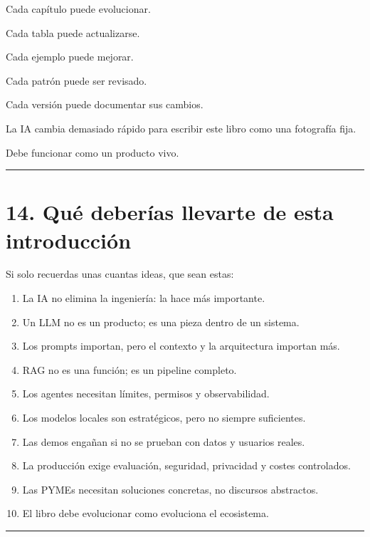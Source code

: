 Cada capítulo puede evolucionar.

Cada tabla puede actualizarse.

Cada ejemplo puede mejorar.

Cada patrón puede ser revisado.

Cada versión puede documentar sus cambios.

La IA cambia demasiado rápido para escribir este libro como una
fotografía fija.

Debe funcionar como un producto vivo.

\begin{center}\rule{0.5\linewidth}{0.5pt}\end{center}

\section{14. Qué deberías llevarte de esta
introducción}\label{quuxe9-deberuxedas-llevarte-de-esta-introducciuxf3n}

Si solo recuerdas unas cuantas ideas, que sean estas:

\begin{enumerate}
\def\labelenumi{\arabic{enumi}.}
\tightlist
\item
  La IA no elimina la ingeniería: la hace más importante.
\item
  Un LLM no es un producto; es una pieza dentro de un sistema.
\item
  Los prompts importan, pero el contexto y la arquitectura importan más.
\item
  RAG no es una función; es un pipeline completo.
\item
  Los agentes necesitan límites, permisos y observabilidad.
\item
  Los modelos locales son estratégicos, pero no siempre suficientes.
\item
  Las demos engañan si no se prueban con datos y usuarios reales.
\item
  La producción exige evaluación, seguridad, privacidad y costes
  controlados.
\item
  Las PYMEs necesitan soluciones concretas, no discursos abstractos.
\item
  El libro debe evolucionar como evoluciona el ecosistema.
\end{enumerate}

\begin{center}\rule{0.5\linewidth}{0.5pt}\end{center}

